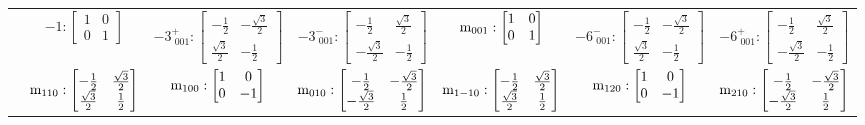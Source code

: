 \documentclass[fleqn,8pt,landscape]{jsarticle}
\begin{document}
\begin{longtable}{ccccccc}
& $ -1:\begin{bmatrix} 1 & 0 \\ 0 & 1 \end{bmatrix} $ & $ -3^{+}_{\,\,001}:\begin{bmatrix} - \frac{1}{2} & - \frac{\sqrt{3}}{2} \\ \frac{\sqrt{3}}{2} & - \frac{1}{2} \end{bmatrix} $ & $ -3^{-}_{\,\,001}:\begin{bmatrix} - \frac{1}{2} & \frac{\sqrt{3}}{2} \\ - \frac{\sqrt{3}}{2} & - \frac{1}{2} \end{bmatrix} $ & $ {\rm m}_{001}:\begin{bmatrix} 1 & 0 \\ 0 & 1 \end{bmatrix} $ & $ -6^{-}_{\,\,001}:\begin{bmatrix} - \frac{1}{2} & - \frac{\sqrt{3}}{2} \\ \frac{\sqrt{3}}{2} & - \frac{1}{2} \end{bmatrix} $ & $ -6^{+}_{\,\,001}:\begin{bmatrix} - \frac{1}{2} & \frac{\sqrt{3}}{2} \\ - \frac{\sqrt{3}}{2} & - \frac{1}{2} \end{bmatrix} $ \\
& $ {\rm m}_{110}:\begin{bmatrix} - \frac{1}{2} & \frac{\sqrt{3}}{2} \\ \frac{\sqrt{3}}{2} & \frac{1}{2} \end{bmatrix} $ & $ {\rm m}_{100}:\begin{bmatrix} 1 & 0 \\ 0 & -1 \end{bmatrix} $ & $ {\rm m}_{010}:\begin{bmatrix} - \frac{1}{2} & - \frac{\sqrt{3}}{2} \\ - \frac{\sqrt{3}}{2} & \frac{1}{2} \end{bmatrix} $ & $ {\rm m}_{1-10}:\begin{bmatrix} - \frac{1}{2} & \frac{\sqrt{3}}{2} \\ \frac{\sqrt{3}}{2} & \frac{1}{2} \end{bmatrix} $ & $ {\rm m}_{120}:\begin{bmatrix} 1 & 0 \\ 0 & -1 \end{bmatrix} $ & $ {\rm m}_{210}:\begin{bmatrix} - \frac{1}{2} & - \frac{\sqrt{3}}{2} \\ - \frac{\sqrt{3}}{2} & \frac{1}{2} \end{bmatrix} $ \\ \hline

\end{longtable}
\end{document}
